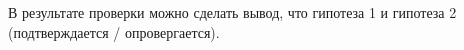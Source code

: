 \documentclass[oneside,senior,etd]{BYUPhys}
\begin{document}
В результате проверки можно сделать вывод, что гипотеза 1 и гипотеза 2 (подтверждается / опровергается).


\nocite{*}

\end{document}

